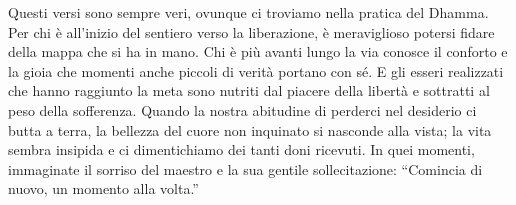 \begin{dhpRefl}
Questi versi sono sempre veri, ovunque ci troviamo nella pratica del Dhamma. Per chi \`{e} all'inizio del sentiero verso la liberazione, \`{e} meraviglioso potersi fidare della mappa che si ha in mano. Chi \`{e} più avanti lungo la via conosce il conforto e la gioia che momenti anche piccoli di verit\`{a} portano con s\'{e}. E gli esseri realizzati che hanno raggiunto la meta sono nutriti dal piacere della libert\`{a} e sottratti al peso della sofferenza. Quando la nostra abitudine di perderci nel desiderio ci butta a terra, la bellezza del cuore non inquinato si nasconde alla vista; la vita sembra insipida e ci dimentichiamo dei tanti doni ricevuti. In quei momenti, immaginate il sorriso del maestro e la sua gentile sollecitazione: ``Comincia di nuovo, un momento alla volta.''
\end{dhpRefl}

